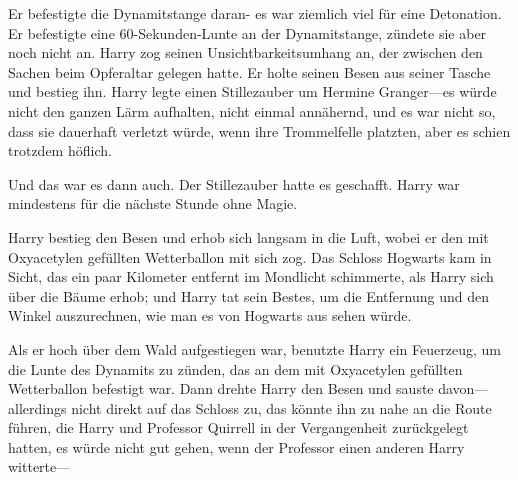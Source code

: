 

Er befestigte die Dynamitstange daran- es war ziemlich viel für eine Detonation. Er befestigte eine 60-Sekunden-Lunte an der Dynamitstange, zündete sie aber noch nicht an. Harry zog seinen Unsichtbarkeitsumhang an, der zwischen den Sachen beim Opferaltar gelegen hatte. Er holte seinen Besen aus seiner Tasche und bestieg ihn. Harry legte einen Stillezauber um Hermine Granger—es würde nicht den ganzen Lärm aufhalten, nicht einmal annähernd, und es war nicht so, dass sie dauerhaft verletzt würde, wenn ihre Trommelfelle platzten, aber es schien trotzdem höflich.

Und das war es dann auch. Der Stillezauber hatte es geschafft. Harry war mindestens für die nächste Stunde ohne Magie.

Harry bestieg den Besen und erhob sich langsam in die Luft, wobei er den mit Oxyacetylen gefüllten Wetterballon mit sich zog. Das Schloss Hogwarts kam in Sicht, das ein paar Kilometer entfernt im Mondlicht schimmerte, als Harry sich über die Bäume erhob; und Harry tat sein Bestes, um die Entfernung und den Winkel auszurechnen, wie man es von Hogwarts aus sehen würde.

Als er hoch über dem Wald aufgestiegen war, benutzte Harry ein Feuerzeug, um die Lunte des Dynamits zu zünden, das an dem mit Oxyacetylen gefüllten Wetterballon befestigt war. Dann drehte Harry den Besen und sauste davon—allerdings nicht direkt auf das Schloss zu, das könnte ihn zu nahe an die Route führen, die Harry und Professor Quirrell in der Vergangenheit zurückgelegt hatten, es würde nicht gut gehen, wenn der Professor einen anderen Harry witterte—

